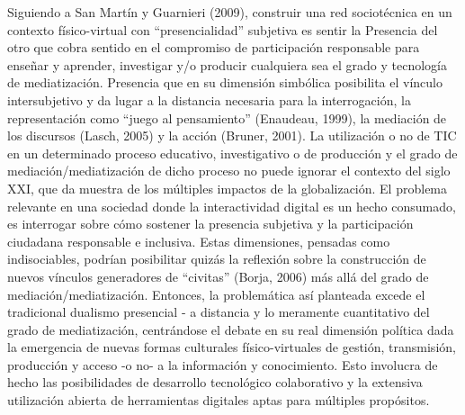 Siguiendo a San Martín y Guarnieri (2009), construir una red sociotécnica en un
contexto físico-virtual con “presencialidad” subjetiva es sentir la Presencia
del otro que cobra sentido en el compromiso de participación responsable para
enseñar y aprender, investigar y/o   producir  cualquiera    sea   el   grado   
y   tecnología de mediatización. Presencia que en su dimensión simbólica
posibilita el vínculo intersubjetivo y da lugar a la distancia necesaria para la
interrogación, la representación como “juego al pensamiento” (Enaudeau, 1999),
la mediación de los  discursos (Lasch, 2005) y la acción (Bruner, 2001). La
utilización o no de TIC en un determinado proceso educativo, investigativo
o de producción y el grado de mediación/mediatización de dicho proceso no puede 
ignorar el contexto del siglo XXI, que da muestra de los múltiples impactos de
la globalización. El problema relevante en una sociedad donde la interactividad
digital es un hecho consumado, es interrogar sobre cómo sostener la presencia
subjetiva y la participación ciudadana responsable e inclusiva. Estas  
dimensiones, pensadas como indisociables, podrían posibilitar quizás la
reflexión sobre la construcción de nuevos vínculos generadores de
“civitas” (Borja, 2006) más allá del grado de mediación/mediatización. Entonces,
la problemática así planteada excede el tradicional dualismo
presencial - a distancia y lo meramente cuantitativo del grado de mediatización,
centrándose el debate en su real dimensión política dada la emergencia de nuevas
formas culturales físico-virtuales de gestión, transmisión, producción y acceso
-o no- a la información y conocimiento. Esto involucra de hecho las
posibilidades de desarrollo tecnológico colaborativo y la extensiva utilización
abierta de herramientas digitales aptas para múltiples propósitos.


